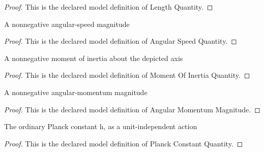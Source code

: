 \begin{proof}
  This is the declared model definition of Length Quantity.
\end{proof}
\begin{definition}
  \label{def:physics:phyx-mini-0582:phyxminiproblems-problemphyxmini0582-angularspeedquantity}
  A nonnegative angular-speed magnitude
\end{definition}
\begin{proof}
  This is the declared model definition of Angular Speed Quantity.
\end{proof}
\begin{definition}
  \label{def:physics:phyx-mini-0582:phyxminiproblems-problemphyxmini0582-momentofinertiaquantity}
  A nonnegative moment of inertia about the depicted axis
\end{definition}
\begin{proof}
  This is the declared model definition of Moment Of Inertia Quantity.
\end{proof}
\begin{definition}
  \label{def:physics:phyx-mini-0582:phyxminiproblems-problemphyxmini0582-angularmomentummagnitude}
  A nonnegative angular-momentum magnitude
\end{definition}
\begin{proof}
  This is the declared model definition of Angular Momentum Magnitude.
\end{proof}
\begin{definition}
  \label{def:physics:phyx-mini-0582:phyxminiproblems-problemphyxmini0582-planckconstantquantity}
  The ordinary Planck constant h, as a unit-independent action
\end{definition}
\begin{proof}
  This is the declared model definition of Planck Constant Quantity.
\end{proof}
